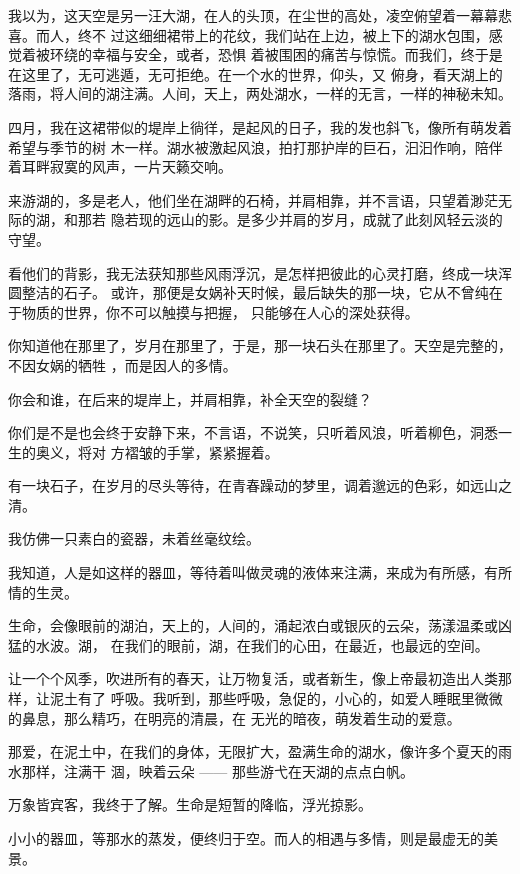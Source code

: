 \documentclass[12pt,a4paper]{article}
\begin{document}
		我以为，这天空是另一汪大湖，在人的头顶，在尘世的高处，凌空俯望着一幕幕悲喜。而人，终不
	过这细细裙带上的花纹，我们站在上边，被上下的湖水包围，感觉着被环绕的幸福与安全，或者，恐惧
	着被围困的痛苦与惊慌。而我们，终于是在这里了，无可逃遁，无可拒绝。在一个水的世界，仰头，又
	俯身，看天湖上的落雨，将人间的湖注满。人间，天上，两处湖水，一样的无言，一样的神秘未知。

		四月，我在这裙带似的堤岸上徜徉，是起风的日子，我的发也斜飞，像所有萌发着希望与季节的树
	木一样。湖水被激起风浪，拍打那护岸的巨石，汩汩作响，陪伴着耳畔寂寞的风声，一片天籁交响。

		来游湖的，多是老人，他们坐在湖畔的石椅，并肩相靠，并不言语，只望着渺茫无际的湖，和那若
	隐若现的远山的影。是多少并肩的岁月，成就了此刻风轻云淡的守望。

		看他们的背影，我无法获知那些风雨浮沉，是怎样把彼此的心灵打磨，终成一块浑圆整洁的石子。
	或许，那便是女娲补天时候，最后缺失的那一块，它从不曾纯在于物质的世界，你不可以触摸与把握，
	只能够在人心的深处获得。

		你知道他在那里了，岁月在那里了，于是，那一块石头在那里了。天空是完整的，不因女娲的牺牲
	，而是因人的多情。

		你会和谁，在后来的堤岸上，并肩相靠，补全天空的裂缝？

		你们是不是也会终于安静下来，不言语，不说笑，只听着风浪，听着柳色，洞悉一生的奥义，将对
	方褶皱的手掌，紧紧握着。

		有一块石子，在岁月的尽头等待，在青春躁动的梦里，调着邈远的色彩，如远山之清。

		我仿佛一只素白的瓷器，未着丝毫纹绘。

		我知道，人是如这样的器皿，等待着叫做灵魂的液体来注满，来成为有所感，有所情的生灵。

		生命，会像眼前的湖泊，天上的，人间的，涌起浓白或银灰的云朵，荡漾温柔或凶猛的水波。湖，
	在我们的眼前，湖，在我们的心田，在最近，也最远的空间。

		让一个个风季，吹进所有的春天，让万物复活，或者新生，像上帝最初造出人类那样，让泥土有了
	呼吸。我听到，那些呼吸，急促的，小心的，如爱人睡眠里微微的鼻息，那么精巧，在明亮的清晨，在
	无光的暗夜，萌发着生动的爱意。

		那爱，在泥土中，在我们的身体，无限扩大，盈满生命的湖水，像许多个夏天的雨水那样，注满干
	涸，映着云朵 —— 那些游弋在天湖的点点白帆。


		万象皆宾客，我终于了解。生命是短暂的降临，浮光掠影。

		小小的器皿，等那水的蒸发，便终归于空。而人的相遇与多情，则是最虚无的美景。
\end{document}
